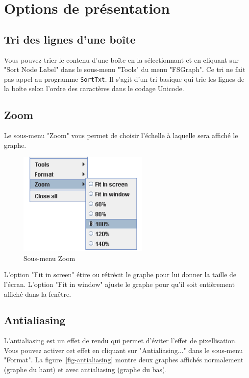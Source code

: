 \bigskip



\section{Options de présentation}

\subsection{Tri des lignes d’une boîte}
Vous pouvez trier le contenu d’une boîte en la sélectionnant et en cliquant sur "Sort Node
Label" dans le sous-menu "Tools" du menu "FSGraph". Ce tri ne fait pas appel au programme
\verb+SortTxt+. Il s’agit d’un tri basique qui trie les lignes de la boîte selon l’ordre des
caractères dans le codage Unicode.


\subsection{Zoom}
Le sous-menu "Zoom" vous permet de choisir l’échelle à laquelle sera affiché le graphe.

\bigskip
\begin{figure}[h]
\begin{center}
\includegraphics[width=6.4cm]{resources/img/fig5-21.png}
\caption{Sous-menu Zoom}
\end{center}
\end{figure}

\noindent L’option "Fit in screen" étire ou rétrécit le graphe pour lui donner la taille de l’écran.
L’option "Fit in window" ajuste le graphe pour qu’il soit entièrement affiché dans la fenêtre.


\subsection{Antialiasing}
L’antialiasing est un effet de rendu qui permet d’éviter l’effet de pixellisation.
 Vous pouvez activer cet effet en cliquant sur "Antialiasing..."
dans le sous-menu "Format". La figure~\ref{fig-antialiasing} montre deux graphes affichés
normalement (graphe du haut) et avec antialiasing (graphe du bas).


